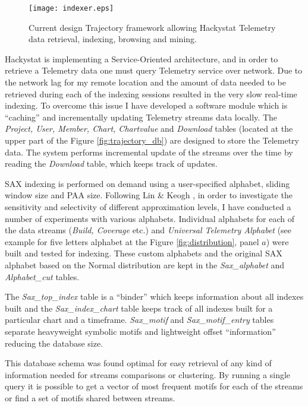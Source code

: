 \begin{figure}[tbp]
   \centering
   \texttt{[image: indexer.eps]}
   \caption{Current design Trajectory framework allowing Hackystat Telemetry data retrieval, indexing, browsing and mining.}
   \label{fig:indexer}
\end{figure}

Hackystat is implementing a Service-Oriented architecture, and in order to retrieve a Telemetry data one must query Telemetry service over network. Due to the network lag for my remote location and the amount of data needed to be retrieved during each of the indexing sessions resulted in the very slow real-time indexing. To overcome this issue I have developed a software module which is ``caching'' and incrementally updating Telemetry streams data locally. The \textit{Project, User, Member, Chart, Chartvalue} and \textit{Download} tables (located at the upper part of the Figure \ref{fig:trajectory_db}) are designed to store the Telemetry data. The system performs incremental update of the streams over the time by reading the \textit{Download} table, which keeps track of updates.

SAX indexing is performed on demand using a user-specified alphabet, sliding window size and PAA size. Following Lin \& Keogh \cite{citeulike:2821475}, in order to investigate the sensitivity and selectivity of different approximation levels, I have conducted a number of experiments with various alphabets. Individual alphabets for each of the data streams (\textit{Build, Coverage} etc.) and \textit{Universal Telemetry Alphabet} (see example for five letters alphabet at the Figure \ref{fig:distribution}, panel $a$) were built and tested for indexing. These custom alphabets and the original SAX alphabet based on the Normal distribution are kept in the \textit{Sax\_alphabet} and \textit{Alphabet\_cut} tables. 

The \textit{Sax\_top\_index} table is a ``binder'' which keeps information about all indexes built and the \textit{Sax\_index\_chart} table keeps track of all indexes built for a particular chart and a timeframe. \textit{Sax\_motif} and \textit{Sax\_motif\_entry} tables separate heavyweight symbolic motifs and lightweight offset ``information'' reducing the database size. 

This database schema was found optimal for easy retrieval of any kind of information needed for streams comparisons or clustering. By running a single query it is possible to get a vector of most frequent motifs for each of the streams or find a set of motifs shared between streams.

